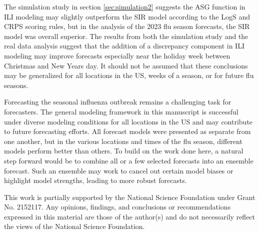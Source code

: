 \documentclass[ba]{imsart}
\theoremstyle{plain}
\theoremstyle{definition}
\theoremstyle{remark}
\begin{document}
The simulation study in section \ref{sec:simulation2} suggests the ASG function in ILI modeling may slightly outperform the SIR model according to the LogS and CRPS scoring rules, but in the analysis of the 2023 flu season forecasts, the SIR model was overall superior. The results from both the simulation study and the real data analysis suggest that the addition of a discrepancy component in ILI modeling may improve forecasts especially near the holiday week between Christmas and New Years day. It should not be assumed that these conclusions may be generalized for all locations in the US, weeks of a season, or for future flu seasons. 

Forecasting the seasonal influenza outbreak remains a challenging task for forecasters. The general modeling framework in this manuscript is successful under diverse modeling conditions for all locations in the US and may contribute to future forecasting efforts. All forecast models were presented as separate from one another, but in the various locations and times of the flu season, different models perform better than others. To build on the work done here, a natural step forward would be to combine all or a few selected forecasts into an ensemble forecast. Such an ensemble may work to cancel out certain model biases or highlight model strengths, leading to more robust forecasts. 





\begin{acks}[Acknowledgments]
This work is partially supported by the National Science Foundation under Grant No. 2152117. Any opinions, findings, and conclusions or recommendations expressed in this material are those of the author(s) and do not necessarily reflect the views of the National Science Foundation.
\end{acks}

% 
% 
\end{document}
